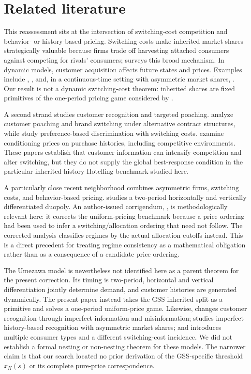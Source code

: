 \section{Related literature}
\label{sec:literature}

This reassessment sits at the intersection of switching-cost competition and behavior- or history-based pricing. Switching costs make inherited market shares strategically valuable because firms trade off harvesting attached consumers against competing for rivals' consumers; \citet{Klemperer1995} surveys this broad mechanism. In dynamic models, customer acquisition affects future states and prices. Examples include \citet{Chen1997}, \citet{VillasBoas1999}, and, in a continuous-time setting with asymmetric market shares, \citet{FabraGarcia2015}. Our result is not a dynamic switching-cost theorem: inherited shares are fixed primitives of the one-period pricing game considered by \citet{GehrigShyStenbacka2012}.

A second strand studies customer recognition and targeted poaching. \citet{FudenbergTirole2000} analyze customer poaching and brand switching under alternative contract structures, while \citet{ShafferZhang2000} study preference-based discrimination with switching costs. \citet{AcquistiVarian2005} examine conditioning prices on purchase histories, including competitive environments. These papers establish that customer information can intensify competition and alter switching, but they do not supply the global best-response condition in the particular inherited-history Hotelling benchmark studied here.

A particularly close recent neighborhood combines asymmetric firms, switching costs, and behavior-based pricing. \citet{Umezawa2022} studies a two-period horizontally and vertically differentiated duopoly. An author-issued corrigendum, \citet{UmezawaCorrigendum2023}, is methodologically relevant here: it corrects the uniform-pricing benchmark because a price ordering had been used to infer a switching/allocation ordering that need not follow. The corrected analysis classifies regimes by the actual allocation cutoffs instead. This is a direct precedent for treating regime consistency as a mathematical obligation rather than as a consequence of a candidate price ordering.

The Umezawa model is nevertheless not identified here as a parent theorem for the present correction. Its timing is two-period, horizontal and vertical differentiation jointly determine demand, and customer histories are generated dynamically. The present paper instead takes the GSS inherited split as a primitive and solves a one-period uniform-price game. Likewise, \citet{Shrivastav2023} changes customer recognition through imperfect information and misinformation; \citet{ColomboGrazianoPignataro2024} studies imperfect history-based recognition with asymmetric market shares; and \citet{UmezawaYamakawa2025} introduces multiple consumer types and a different switching-cost incidence. We did not establish a formal nesting or non-nesting theorem for these models. The narrower claim is that our search located no prior derivation of the GSS-specific threshold \(x_H(s)\) or its complete pure-price correspondence.

